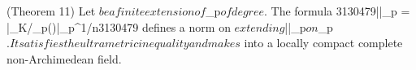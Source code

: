 (Theorem 11) Let $ be a finite extension of $_p$ of degree $. The formula
3130479|\alpha|_p = |_{K/_p}(\alpha)|_p^{1/n}3130479
defines a norm on $ extending $|\cdot|_p$ on $_p$. It satisfies the ultrametric inequality and makes $ into a locally compact complete non-Archimedean field.
